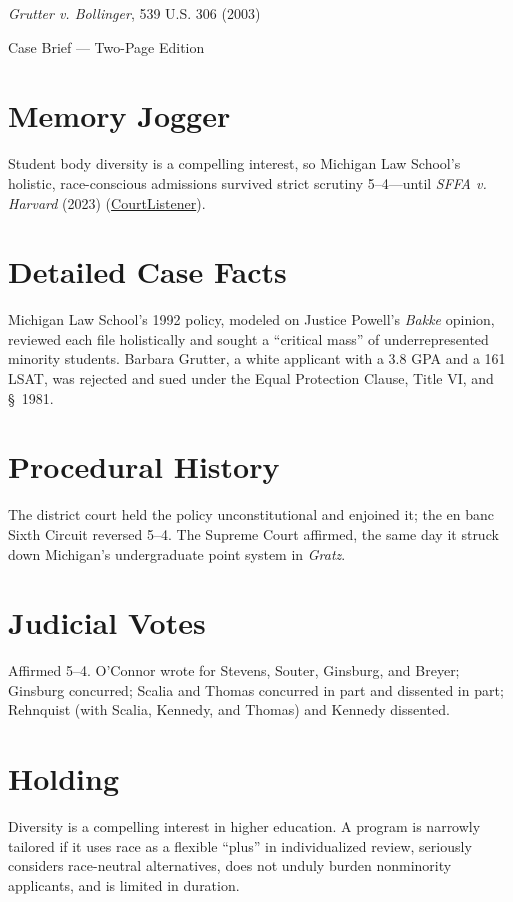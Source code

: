 \documentclass[12pt]{article}
\begin{document}
\begin{center}
{\LARGE \textit{Grutter v. Bollinger}, 539 U.S. 306 (2003)\par}
\vspace{0.5em}
{\large Case Brief --- Two-Page Edition\par}
\end{center}

\section{Memory Jogger}
Student body diversity is a compelling interest, so Michigan Law School's holistic, race-conscious admissions survived strict scrutiny 5--4---until \textit{SFFA v. Harvard} (2023) (\href{https://www.courtlistener.com/opinion/130155/grutter-v-bollinger/}{CourtListener}).

\section{Detailed Case Facts}
Michigan Law School's 1992 policy, modeled on Justice Powell's \textit{Bakke} opinion, reviewed each file holistically and sought a ``critical mass'' of underrepresented minority students. Barbara Grutter, a white applicant with a 3.8 GPA and a 161 LSAT, was rejected and sued under the Equal Protection Clause, Title VI, and \S~1981.

\section{Procedural History}
The district court held the policy unconstitutional and enjoined it; the en banc Sixth Circuit reversed 5--4. The Supreme Court affirmed, the same day it struck down Michigan's undergraduate point system in \textit{Gratz}.

\section{Judicial Votes}
Affirmed 5--4. O'Connor wrote for Stevens, Souter, Ginsburg, and Breyer; Ginsburg concurred; Scalia and Thomas concurred in part and dissented in part; Rehnquist (with Scalia, Kennedy, and Thomas) and Kennedy dissented.

\section{Holding}
Diversity is a compelling interest in higher education. A program is narrowly tailored if it uses race as a flexible ``plus'' in individualized review, seriously considers race-neutral alternatives, does not unduly burden nonminority applicants, and is limited in duration.
\end{document}
